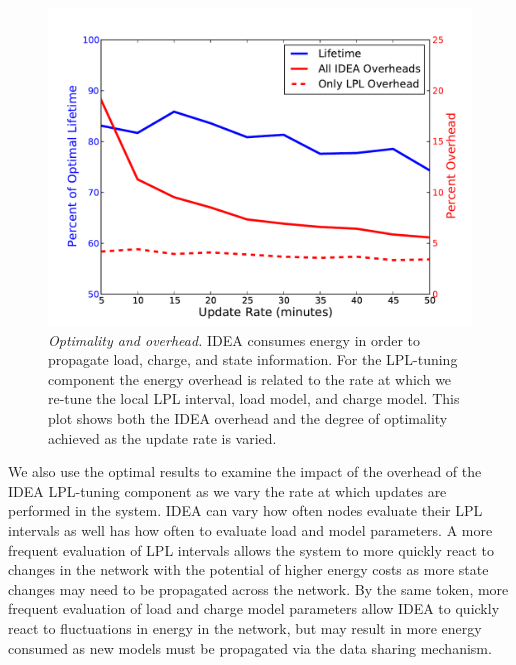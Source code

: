 \begin{figure}[t]
\begin{center}
\includegraphics[width=\hsize]{./figs/graph_update_rate_overhead.pdf}
\end{center}

\caption{\textit{Optimality and overhead.} IDEA consumes energy in order to
propagate load, charge, and state information. For the LPL-tuning component
the energy overhead is related to the rate at which we re-tune the local LPL
interval, load model, and charge model. This plot shows both the IDEA
overhead and the degree of optimality achieved as the update rate is varied.}

\label{fig-lploverhead}
\end{figure}

We also use the optimal results to examine the impact of the overhead of the
IDEA LPL-tuning component as we vary the rate at which updates are performed
in the system. IDEA can vary how often nodes evaluate their LPL intervals as
well has how often to evaluate load and model parameters. A more frequent
evaluation of LPL intervals allows the system to more quickly react to
changes in the network with the potential of higher energy costs as more
state changes may need to be propagated across the network. By the same
token, more frequent evaluation of load and charge model parameters allow
IDEA to quickly react to fluctuations in energy in the network, but may
result in more energy consumed as new models must be propagated via the data
sharing mechanism.

\vfill\eject

